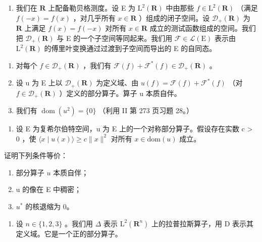 \begin{enumerate}
\def\labelenumi{\arabic{enumi})}
\setcounter{enumi}{11}
\tightlist
\item
  我们在 \(\mathbf{R}\) 上配备勒贝格测度。设 E 为 \(\mathrm{L}^2 (\mathbf{R})\) 中由那些 \(f\in \mathrm{L}^2 (\mathbf{R})\) （满足 \(f(-x) = f(x)\) ，对几乎所有 \(x\in \mathbf{R}\) ）组成的闭子空间。设 \(\mathcal{D}_{+}(\mathbf{R})\) 为 \(\mathbf{R}\) 上满足 \(f(x) = f(-x)\) 对所有 \(x\in \mathbf{R}\) 成立的测试函数组成的空间。我们把 \(\mathcal{D}_{+}(\mathbf{R})\) 与 E 的一个子空间等同起来。我们用 \(\mathcal{F}\in \mathcal{L}(\mathrm{E})\) 表示由 \(\mathrm{L}^2 (\mathbf{R})\) 的傅里叶变换通过过渡到子空间而导出的 E 的自同态。
\end{enumerate}

\begin{enumerate}
\def\labelenumi{\alph{enumi})}
\item
  对每个 \(f \in \mathcal{D}_{+}(\mathbf{R})\) ，我们有 \(\mathcal{F}(f) + \mathcal{F}^{*}(f) \in \mathcal{D}_{+}(\mathbf{R})\) 。
\item
  设 u 为 E 上以 \(\mathcal{D}_{+}(\mathbf{R})\) 为定义域、由 \(u(f) = \mathcal{F}(f) + \mathcal{F}^{*}(f)\) （对 \(f \in \mathcal{D}_{+}(\mathbf{R})\) ）定义的部分算子。算子 u 本质自伴。
\item
  我们有 \(\operatorname{dom}(u^{2})=\{0\}\) （利用 II 第 273 页习题 28。）
\end{enumerate}

\begin{enumerate}
\def\labelenumi{\arabic{enumi})}
\setcounter{enumi}{12}
\tightlist
\item
  设 E 为复希尔伯特空间，u 为 E 上的一个对称部分算子。假设存在实数 c \textgreater{} 0 ，使 \(\langle x \mid u(x) \rangle \geqslant c \|x\|^{2}\) 对所有 \(x \in \text{dom}(u)\) 成立。
\end{enumerate}

证明下列条件等价：

\begin{enumerate}
\def\labelenumi{(\roman{enumi})}
\item
  部分算子 \(u\) 本质自伴；
\item
  u 的像在 E 中稠密；
\item
  \(u^{*}\) 的核退缩为 0。
\end{enumerate}

\begin{enumerate}
\def\labelenumi{\arabic{enumi})}
\setcounter{enumi}{13}
\tightlist
\item
  设 \(n \in \{1, 2, 3\}\) 。我们用 \(\Delta\) 表示 \(\mathrm{L}^2(\mathbf{R}^n)\) 上的拉普拉斯算子，用 D 表示其定义域。它是一个正的部分算子。
\end{enumerate}

